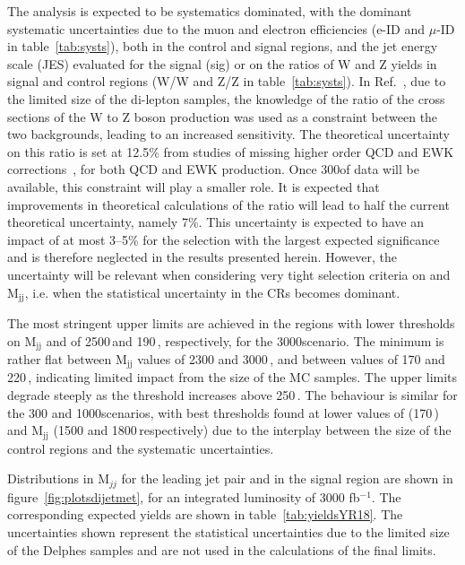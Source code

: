 \documentclass[../report.tex]{subfiles}
\begin{document}
The analysis is expected to be systematics dominated, with the
dominant systematic uncertainties due to the muon and electron
efficiencies (e-ID and $\mu$-ID in table~\ref{tab:systs}), both in the control and signal regions, and the jet
energy scale (JES) evaluated for the signal (sig) or on the ratios of W and Z yields in signal and control regions (W/W and Z/Z in table~\ref{tab:systs}). In Ref.~\cite{Sirunyan:2018owy}, due to the limited size of the di-lepton
samples, the knowledge of the ratio of the cross sections of the W to
Z boson production was used as a constraint between the two
backgrounds, leading to an increased sensitivity. The theoretical
uncertainty on this ratio is set at 12.5\% from studies of missing
higher order QCD and EWK corrections~\cite{Sirunyan:2018owy}, for both
QCD and EWK production. Once 300\fbinv of data will be available, this
constraint will play a smaller role. It is expected that improvements
in theoretical calculations of the ratio will lead to half the current
theoretical uncertainty, namely 7\%.  This uncertainty is expected to
have an impact of at most 3--5\% for the selection with the largest
expected significance and is therefore neglected in the results
presented herein. However, the uncertainty will be relevant when
considering very tight selection criteria on \MET and M$_{\text{jj}}$,
i.e. when the statistical uncertainty in the CRs becomes dominant.


The most stringent upper limits are achieved in the regions with lower
thresholds on M$_{\text{jj}}$ and \MET of 2500\,\UGeV and 190\,\UGeV,
respectively, for the 3000\fbinv scenario. The minimum is rather flat
between M$_{\text{jj}}$ values of 2300 and 3000\,\UGeV, and between
\MET values of 170 and 220\,\UGeV, indicating limited impact from the size of the MC
samples. The upper limits degrade steeply as the \MET threshold
increases above 250\,\UGeV. The behaviour is similar for the 300 and
1000\fbinv scenarios, with best thresholds found at lower values
of \MET (170\,\UGeV) and M$_{\text{jj}}$ (1500 and 1800\,\UGeV respectively)
due to the interplay between the size of the control regions and the
systematic uncertainties.

Distributions in M$_{jj}$ for
the leading jet pair and \MET in the signal region are shown in
figure~\ref{fig:plotsdijetmet}, for an integrated luminosity of 3000 fb$^{-1}$. The
corresponding expected yields are shown in
table~\ref{tab:yieldsYR18}. The uncertainties shown represent the statistical 
uncertainties due to the limited size of the Delphes samples and are not used in the calculations
of the final limits.
\end{document}
